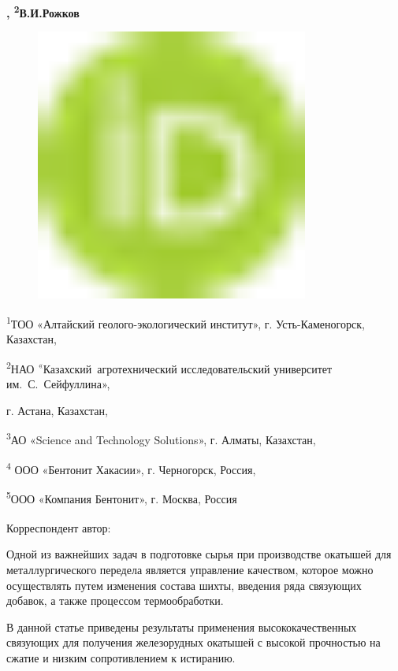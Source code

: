 {\bfseries ,
\textsuperscript{2}В.И.Рожков}
\begin{figure}[H]
	\centering
	\includegraphics[width=0.8\textwidth]{media/chem2/image1}
	\caption*{}
\end{figure}


\textsuperscript{1}ТОО «Алтайский геолого-экологический институт», г.
Усть-Каменогорск, Казахстан,

\textsuperscript{2}НАО \textsuperscript{«}Казахский~агротехнический
исследовательский университет им.~С.~Сейфуллина»,

г. Астана, Казахстан,

\textsuperscript{3}АО «Science and Technology Solutions», г. Алматы,
Казахстан,

\textsuperscript{4} ООО «Бентонит Хакасии», г. Черногорск, Россия,

\textsuperscript{5}ООО «Компания Бентонит», г. Москва, Россия

{\bfseries \textsuperscript{\envelope }}Корреспондент автор:
\href{mailto:rozhkova.o@stsolutions.kz}{}

Одной из важнейших задач в подготовке сырья при производстве окатышей
для металлургического передела является управление качеством, которое
можно осуществлять путем изменения состава шихты, введения ряда
связующих добавок, а также процессом термообработки.

В данной статье приведены результаты применения высококачественных
связующих для получения железорудных окатышей с высокой прочностью на
сжатие и низким сопротивлением к истиранию.

